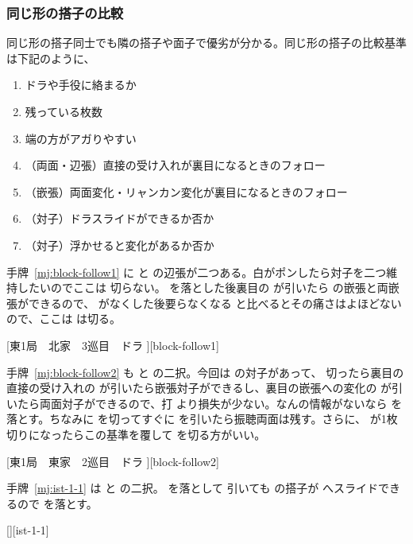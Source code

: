 \documentclass[../nankiru_main.tex]{subfiles}
\begin{document}
\subsubsection*{同じ形の搭子の比較}

同じ形の搭子同士でも隣の搭子や面子で優劣が分かる。同じ形の搭子の比較基準は下記のように、

\begin{enumerate}
\item ドラや手役に絡まるか
\item 残っている枚数
\item 端の方がアガりやすい
\item （両面・辺張）直接の受け入れが裏目になるときのフォロー
\item （嵌張）両面変化・リャンカン変化が裏目になるときのフォロー
\item （対子）ドラスライドができるか否か
\item （対子）浮かせると変化があるか否か
\end{enumerate}

手牌~\ref{mj:block-follow1} に  と  の辺張が二つある。白がポンしたら対子を二つ維持したいのでここは  切らない。 を落とした後裏目の  が引いたら  の嵌張と両嵌張ができるので、 がなくした後要らなくなる  と比べるとその痛さはよほどないので、ここは  は切る\citep{yuusee-follow}。

[東1局　北家　3巡目　ドラ ][block-follow1]

手牌~\ref{mj:block-follow2} も  と  の二択。今回は  の対子があって、 切ったら裏目の直接の受け入れの  が引いたら嵌張対子ができるし、裏目の嵌張への変化の  が引いたら両面対子ができるので、打  より損失が少ない。なんの情報がないなら  を落とす。ちなみに  を切ってすぐに  を引いたら振聴両面は残す。さらに、 が1枚切りになったらこの基準を覆して  を切る方がいい\citep{yuusee-follow}。

[東1局　東家　2巡目　ドラ ][block-follow2]

手牌~\ref{mj:ist-1-1} は  と  の二択。 を落として  引いても  の搭子が  へスライドできるので  を落とす\citep{gendai-iishanten-yojouhai}。

[][ist-1-1]
\end{document}
